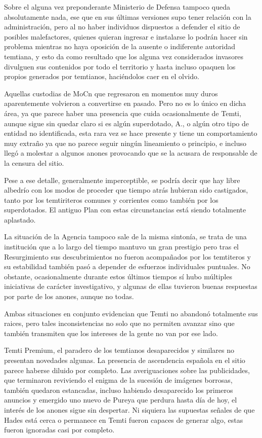 \documentclass[
]{book}
\begin{document}
Sobre el alguna vez preponderante Ministerio de Defensa tampoco queda absolutamente nada, ese que en sus últimas versiones supo tener relación con la administración, pero al no haber individuos dispuestos a defender el sitio de posibles malefactores, quienes quieran ingresar e instalarse lo podrán hacer sin problema mientras no haya oposición de la ausente o indiferente autoridad temtiana, y esto da como resultado que los alguna vez considerados invasores divulguen sus contenidos por todo el territorio y hasta incluso opaquen los propios generados por temtianos, haciéndolos caer en el olvido.

Aquellas custodias de MoCn que regresaron en momentos muy duros aparentemente volvieron a convertirse en pasado. Pero no es lo único en dicha área, ya que parece haber una presencia que cuida ocasionalmente de Temti, aunque sigue sin quedar claro si es algún superdotado, A., o algún otro tipo de entidad no identificada, esta rara vez se hace presente y tiene un comportamiento muy extraño ya que no parece seguir ningún lineamiento o principio, e incluso llegó a molestar a algunos anones provocando que se la acusara de responsable de la censura del sitio.

Pese a ese detalle, generalmente imperceptible, se podría decir que hay libre albedrío con los modos de proceder que tiempo atrás hubieran sido castigados, tanto por los temtiriteros comunes y corrientes como también por los superdotados. El antiguo Plan con estas circunstancias está siendo totalmente aplastado.

La situación de la Agencia tampoco sale de la misma sintonía, se trata de una institución que a lo largo del tiempo mantuvo un gran prestigio pero tras el Resurgimiento sus descubrimientos no fueron acompañados por los temtiteros y su estabilidad también pasó a depender de esfuerzos individuales puntuales. No obstante, ocasionalmente durante estos últimos tiempos sí hubo múltiples iniciativas de carácter investigativo, y algunas de ellas tuvieron buenas respuestas por parte de los anones, aunque no todas.

Ambas situaciones en conjunto evidencian que Temti no abandonó totalmente sus raices, pero tales inconsistencias no solo que no permiten avanzar sino que también transmiten que los intereses de la gente no van por ese lado.

Temti Premium, el paradero de los temtianos desaparecidos y similares no presentan novedades algunas. La presencia de ascendencia española en el sitio parece haberse diluido por completo. Las averiguaciones sobre las publicidades, que terminaron reviviendo el enigma de la sucesión de imágenes borrosas, también quedaron estancadas, incluso habiendo desaparecido los primeros anuncios y emergido uno nuevo de Pureya que perdura hasta día de hoy, el interés de los anones sigue sin despertar. Ni siquiera las supuestas señales de que Hades está cerca o permanece en Temti fueron capaces de generar algo, estas fueron ignoradas casi por completo.
\end{document}
